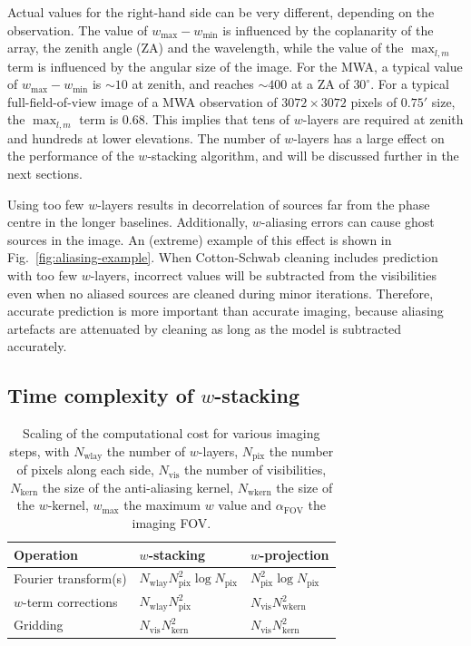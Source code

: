 \documentclass[useAMS,usenatbib]{mn2e}
\begin{document}
Actual values for the right-hand side can be very different, depending on the observation. The value of $w_{\max} - w_{\min}$ is influenced by the coplanarity of the array, the zenith angle (ZA) and the wavelength, while the value of the $\max_{l,m}$ term is influenced by the angular size of the image. For the MWA, a typical value of $w_{\max} - w_{\min}$ is $\sim 10$ at zenith, and reaches $\sim 400$ at a ZA of $30^{\circ}$. For a typical full-field-of-view image of a MWA observation of $3072\times 3072$ pixels of $0.75'$ size, the $\max_{l,m}$ term is $0.68$. This implies that tens of $w$-layers are required at zenith and hundreds at lower elevations. The number of $w$-layers has a large effect on the performance of the $w$-stacking algorithm, and will be discussed further in the next sections.

Using too few $w$-layers results in decorrelation of sources far from the phase centre in the longer baselines. Additionally, $w$-aliasing errors can cause ghost sources in the image. An (extreme) example of this effect is shown in Fig.~\ref{fig:aliasing-example}. When Cotton-Schwab cleaning includes prediction with too few $w$-layers, incorrect values will be subtracted from the visibilities even when no aliased sources are cleaned during minor iterations. Therefore, accurate prediction is more important than accurate imaging, because aliasing artefacts are attenuated by cleaning as long as the model is subtracted accurately.

\subsection{Time complexity of $w$-stacking} \label{sec:time-complexity}
\begin{table}
 \caption{Scaling of the computational cost for various imaging steps, with $N_\textrm{wlay}$ the number of $w$-layers, $N_\textrm{pix}$ the number of pixels along each side, $N_\textrm{vis}$ the number of visibilities, $N_\textrm{kern}$ the size of the anti-aliasing kernel, $N_\textrm{wkern}$ the size of the $w$-kernel, $w_{\max}$ the maximum $w$ value and $\alpha_\textrm{FOV}$ the imaging FOV.} \label{tbl:computational-cost-per-operation}
 \begin{tabular}{lll}
   \textbf{Operation} & \textbf{$w$-stacking} & \textbf{$w$-projection} \\
   \hline\hline
   Fourier transform(s) & $N_\textrm{wlay} N^2_\textrm{pix} \log N_\textrm{pix}$ & $N^2_\textrm{pix} \log N_\textrm{pix}$ \\
   $w$-term corrections   & $N_\textrm{wlay} N^2_\textrm{pix}$ & $N_\textrm{vis} N^2_\textrm{wkern}$ \\
   Gridding & $N_\textrm{vis}N^2_\textrm{kern}$ & $N_\textrm{vis} N_\textrm{kern}^2$ \\
   \hline\hline
 \end{tabular}
\end{table}
\end{document}
